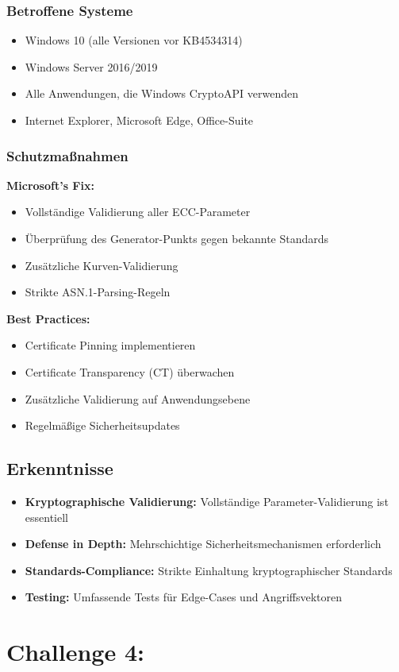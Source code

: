 \documentclass{article}
\begin{document}
\subsubsection{Betroffene Systeme}

\begin{itemize}
    \item Windows 10 (alle Versionen vor KB4534314)
    \item Windows Server 2016/2019
    \item Alle Anwendungen, die Windows CryptoAPI verwenden
    \item Internet Explorer, Microsoft Edge, Office-Suite
\end{itemize}

\subsubsection{Schutzmaßnahmen}

\textbf{Microsoft's Fix:}
\begin{itemize}
    \item Vollständige Validierung aller ECC-Parameter
    \item Überprüfung des Generator-Punkts gegen bekannte Standards
    \item Zusätzliche Kurven-Validierung
    \item Strikte ASN.1-Parsing-Regeln
\end{itemize}

\textbf{Best Practices:}
\begin{itemize}
    \item Certificate Pinning implementieren
    \item Certificate Transparency (CT) überwachen
    \item Zusätzliche Validierung auf Anwendungsebene
    \item Regelmäßige Sicherheitsupdates
\end{itemize}

\subsection{Erkenntnisse}

\begin{itemize}
    \item \textbf{Kryptographische Validierung:} Vollständige Parameter-Validierung ist essentiell
    \item \textbf{Defense in Depth:} Mehrschichtige Sicherheitsmechanismen erforderlich
    \item \textbf{Standards-Compliance:} Strikte Einhaltung kryptographischer Standards
    \item \textbf{Testing:} Umfassende Tests für Edge-Cases und Angriffsvektoren
\end{itemize}

\section{Challenge 4:}
\end{document}
